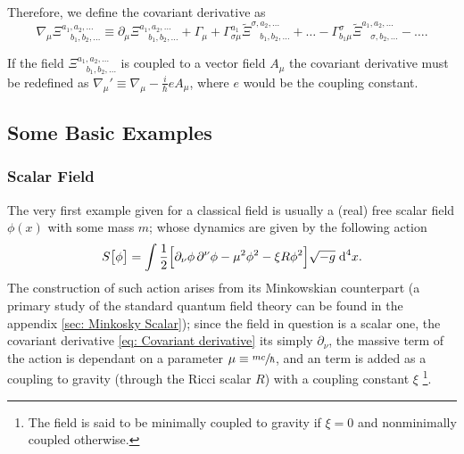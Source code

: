 Therefore, we define the covariant derivative as
\begin{equation}\label{eq: Covariant derivative}
	\nabla_\mu\Xi^{a_1,a_2,\hdots}_{\quad b_1,b_2,\hdots}\equiv \partial_\mu \Xi^{a_1,a_2,\hdots}_{\quad b_1,b_2,\hdots}+\Gamma_\mu+\Gamma^{a_1}_{\sigma\mu}\tilde\Xi^{\sigma,a_2,\hdots}_{\quad b_1,b_2,\hdots}+\hdots-\Gamma^{\sigma}_{b_1\mu}\tilde\Xi^{a_1,a_2,\hdots}_{\quad \sigma,b_2,\hdots}-\hdots.
\end{equation}

If the field $\Xi^{a_1,a_2,\hdots}_{\quad b_1,b_2,\hdots}$ is coupled to a vector field $A_\mu$ the covariant derivative must be redefined as $\nabla_\mu'\equiv\nabla_\mu-\frac{i}{\hbar}eA_\mu$, where $e$ would be the coupling constant.
\subsection{Some Basic Examples}
\subsubsection{Scalar Field}
The very first example given for a classical field is usually a (real) free scalar field $\phi(x)$ with some mass $m$; whose dynamics are given by the following action
\begin{equation}\label{eq: General scalar field action}
	S\big[\phi\big]=\int\frac{1}{2}\Big[\partial_\nu\phi\,\partial^\nu\phi-\mu^2\phi^2-\xi R\phi^2\Big]\sqrt{-g}\;\text{d}^4 x.
\end{equation}
The construction of such action arises from its Minkowskian counterpart (a primary study of the standard quantum field theory can be found in the appendix \ref{sec: Minkosky Scalar}); since the field in question is a scalar one, the covariant derivative \ref{eq: Covariant derivative} its simply $\partial_\nu$, the massive term of the action is dependant on a parameter $\mu\equiv\sfrac{mc}{\hbar}$, and an term is added as a coupling to gravity (through the Ricci scalar $R$) with a coupling constant $\xi$ \footnote{The field is said to be minimally coupled to gravity if $\xi=0$ and nonminimally coupled otherwise.}.

